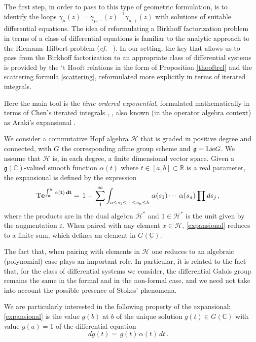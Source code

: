 \documentclass[10pt]{amsart}
\def\C{{\mathbb C}}
\def\R{{\mathbb R}}
\def\cH{{\mathcal H}}
\def\Hc{{\mathcal H}}
\newcommand{\fg}{{\mathfrak{g}}}
\def\a{\alpha}
\def\ve{\varepsilon}
\def\Lie{{\rm Lie}}
\newcommand{\cf}{{\it cf.\/}\ }
\numberwithin{equation}{section}
\begin{document}
The first step, in order to pass to this type of geometric formulation, is to
identify the loops $\gamma_\mu(z)=\gamma_{\mu,-}(z)^{-1}
\gamma_{\mu,+}(z)$ with solutions of suitable differential
equations. The idea of reformulating a Birkhoff factorization
problem in terms of a class of differential equations is familiar to
the analytic approach to the Riemann--Hilbert problem (\cf
\cite{Boj}). In our setting, the key that allows us to pass from
the Birkhoff factorization
to an appropriate class of differential systems is provided by the `t
Hooft relations in the form of Proposition \ref{thooftrel}
and the scattering formula \eqref{scattering}, reformulated more
explicitly in terms of iterated integrals.

\smallskip

Here the main tool is the {\em time ordered exponential}, formulated
mathematically in terms of Chen's iterated integrals \cite{Chen1},
\cite{Chen2}, also known (in the operator algebra context) as Araki's
expansional \cite{Araki}.

\smallskip

We consider a commutative Hopf algebra $\cH$
that is graded in positive degree and connected, with $G$ the
corresponding affine group scheme and $\fg=\Lie G$.
We assume that $\Hc$ is, in each degree, a finite dimensional vector
space. Given a $\fg(\C)$-valued smooth
function $\a(t)$ where $t\in[a,b]\subset \R$ is a real parameter, the
expansional is defined by the expression
\begin{equation}\label{expansional}
 {\bf {\rm T}e^{\int_a^b\,\a(t)\,dt}}=\,1+\, \sum_1^\infty \int_{a\leq
s_1\leq \cdots\leq
s_n\leq b} \,\a(s_1)\cdots\,\a(s_n) \prod ds_j \,,
\end{equation}
where the products are in the dual algebra $\Hc^*$ and $1\in \Hc^*$ is
the unit given by the augmentation $\ve$. When paired with any element
$x\in \Hc$, \eqref{expansional} reduces to a finite sum, which defines
an element in $G(\C)$.

\smallskip

The fact that, when pairing with elements in
$\Hc$ one reduces to an algebraic (polynomial) case plays an important
role. In particular, it is related to the fact that, for the class of
differential systems we consider, the differential
Galois group remains the same in the formal and in the non-formal
case, and we need not take into account the possible presence of
Stokes' phenomena.

\smallskip

We are particularly interested in the following property of the
expansional: \eqref{expansional} is the value $g(b)$ at $b$ of
the unique solution $g(t)\in G(\C)$ with value $g(a)=1$ of
the differential equation
\begin{equation}\label{diffexp}
 dg(t)=\,g(t)\,\a(t)\,dt\,.
\end{equation}
\end{document}
